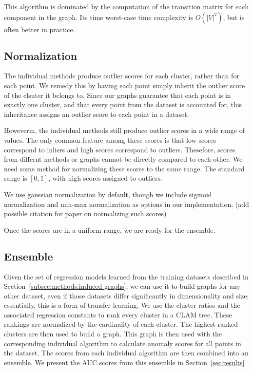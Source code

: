 This algorithm is dominated by the computation of the transition matrix for each component in the graph.
Its time worst-case time complexity is $O(|V|^2)$, but is often better in practice.


\subsection{Normalization}\label{subsec:methods:normalization}
The individual methods produce outlier scores for each cluster, rather than for each point.
We remedy this by having each point simply inherit the outlier score of the clsuter it belongs to.
Since our graphs guarantee that each point is in exactly one cluster, and that every point from the dataset is accounted for, this inheritance assigns an outlier score to each point in a dataset.

Howeverm, the individual methods still produce outlier scores in a wide range of values.
The only common feature among these scores is that low scores correspond to inliers and high scores correspond to outliers.
Thesefore, scores from differnt methods or graphs cannot be directly compared to each other.
We need some method for normalizing these scores to the same range.
The standard range is $[0, 1]$, with high scores assigned to outliers.

We use gaussian normalization by default, though we include sigmoid normalization and min-max normalization as options in our implementation. (add possible citation for paper on normalizing such scores)


Once the scores are in a uniform range, we are ready for the ensemble.


\subsection{Ensemble}\label{subsec:methods:ensemble}
Given the set of regression models learned from the training datasets described in Section~\ref{subsec:methods:induced-graphs}, we can use it to build graphs for any other dataset, even if those datasets differ significantly in dimensionality and size; essentially, this is a form of transfer learning.
We use the cluster ratios and the associated regression constants to rank every cluster in a CLAM tree.
These rankings are normalized by the cardinality of each cluster.
The highest ranked clusters are then used to build a graph.
This graph is then used with the corresponding individual algorithm to calculate anomaly scores for all points in the dataset.
The scores from each individual algorithm are then combined into an ensemble.
We present the AUC scores from this ensemble in Section~\ref{sec:results}


